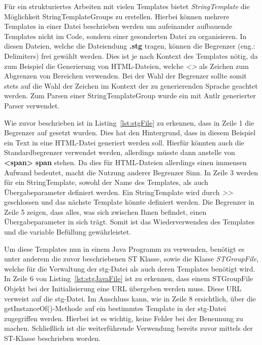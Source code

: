 Für ein strukturiertes Arbeiten mit vielen Templates bietet \textit{StringTemplate} die Möglichkeit StringTemplateGroups zu erstellen.
Hierbei können mehrere Templates in einer Datei beschrieben werden um aufeinander aufbauende Templates nicht im Code, sondern einer gesonderten Datei zu organisieren.
In diesen Dateien, welche die Dateiendung \textbf{.stg} tragen, können die Begrenzer (eng.: Delimiters) frei gewählt werden.
Dies ist je nach Kontext des Templates nötig, da zum Beispiel die Generierung von HTML-Dateien, welche \textit{<>} als Zeichen zum Abgrenzen von Bereichen verwenden.
Bei der Wahl der Begrenzer sollte somit stets auf die Wahl der Zeichen im Kontext der zu generierenden Sprache geachtet werden.
Zum Parsen einer StringTemplateGroup wurde ein mit Antlr generierter Parser verwendet.\cite*{stgParser}



Wie zuvor beschrieben ist in Listing~\ref{lst:stgFile} zu erkennen, dass in Zeile 1 die Begrenzer auf \textit{{}} gesetzt wurden.
Dies hat den Hintergrund, dass in diesem Beispiel ein Text in eine HTML-Datei generiert werden soll.
Hierfür könnten auch die Standardbegrenzer verwendet werden, allerdings müsste dann anstelle von \textbf{<span>} \textbf{\<span\>} stehen.
Da dies für HTML-Dateien allerdings einen immensen Aufwand bedeutet, macht die Nutzung anderer Begrenzer Sinn.
In Zeile 3 werden für ein StringTemplate, sowohl der Name des Templates, als auch Übergabeparameter definiert werden.
Ein StringTemplate wird durch \textit{>>} geschlossen und das nächste Template könnte definiert werden.
Die Begrenzer in Zeile 5 zeigen, dass alles, was sich zwischen Ihnen befindet, einen Übergabeparameter in sich trägt.
Somit ist das Wiederverwenden des Templates und die variable Befüllung gewährleistet.

Um diese Templates nun in einem Java Programm zu verwenden, benötigt es unter anderem die zuvor beschriebenen ST Klasse, sowie
die Klasse \textit{STGroupFile}, welche für die Verwaltung der stg-Datei als auch deren Templates benötigt wird.
In Zeile 6 von Listing~\ref{lst:stgJavaFile} ist zu erkennen, dass einem STGroupFile Objekt bei der Initialisierung eine URL übergeben werden muss.
Diese URL verweist auf die stg-Datei.
Im Anschluss kann, wie in Zeile 8 ersichtlich, über die getInstanceOf()-Methode auf ein bestimmtes Template in der stg-Datei zugegriffen werden.
Hierbei ist es wichtig, keine Fehler bei der Benennung zu machen.
Schließlich ist die weiterführende Verwendung bereits zuvor mittels der ST-Klasse beschrieben worden.

